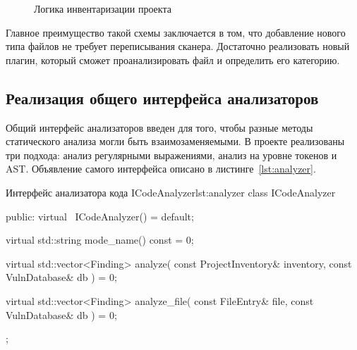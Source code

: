 \documentclass{itmo-vkr}
\begin{document}
\begin{figure}[ht]
  \centering
  \caption{Логика инвентаризации проекта}
  \label{fig:inv}
\end{figure}

Главное преимущество такой схемы заключается в том, что добавление нового типа файлов не требует переписывания сканера. Достаточно реализовать новый плагин, который сможет проанализировать файл и определить его категорию.


\subsection{Реализация общего интерфейса анализаторов}

Общий интерфейс анализаторов введен для того, чтобы разные методы статического анализа могли быть взаимозаменяемыми. В проекте реализованы три подхода: анализ регулярными выражениями, анализ на уровне токенов и AST. Объявление самого интерфейса описано в листинге~\ref{lst:analyzer}.

\begin{itmolisting}[C++]{Интерфейс анализатора кода ICodeAnalyzer}{lst:analyzer}
class ICodeAnalyzer {
	public:
	virtual ~ICodeAnalyzer() = default;
	
	virtual std::string mode_name() const = 0;
	
	virtual std::vector<Finding> analyze(
	const ProjectInventory& inventory,
	const VulnDatabase& db
	) = 0;
	
	virtual std::vector<Finding> analyze_file(
	const FileEntry& file,
	const VulnDatabase& db
	) = 0;
};
\end{itmolisting}
\end{document}

